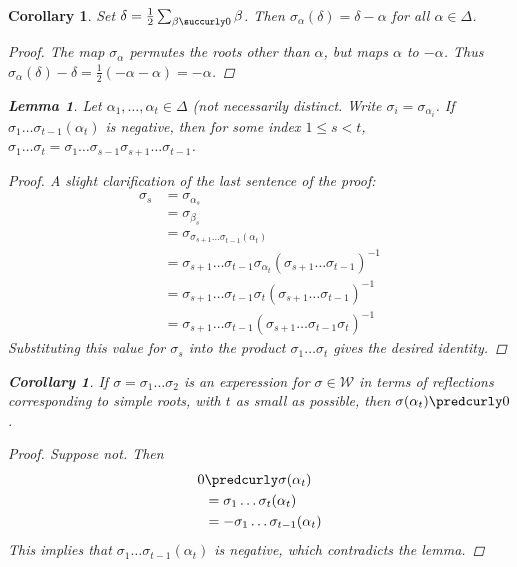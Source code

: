 \documentclass{article}
\newtheorem{lem}[thm]{Lemma}
\newtheorem{cor}[thm]{Corollary}
\begin{document}
\begin{cor} Set $\delta = \frac{1}{2} \sum_{\beta \succurly 0} \beta$. Then $\sigma_\alpha(\delta) = \delta - \alpha$ for all $\alpha \in \Delta$.
\begin{proof}
The map $\sigma_\alpha$ permutes the roots other than $\alpha$, but maps $\alpha$ to $-\alpha$.  
Thus $\sigma_\alpha(\delta) - \delta = \frac{1}{2} (-\alpha - \alpha) = -\alpha$.
\end{proof}

\begin{lem} Let $\alpha_1, \ldots, \alpha_t \in \Delta$ (not necessarily distinct. Write $\sigma_i = \sigma_{\alpha_i}$.
If $\sigma_1 \ldots \sigma_{t-1}(\alpha_t)$ is negative, then for some index 
$1 \le s < t$, $\sigma_1 \ldots \sigma_t = \sigma_1 \ldots \sigma_{s-1} \sigma_{s+1} \ldots
\sigma_{t-1}$.
\begin{proof}
A slight clarification of the last sentence of the proof:
\begin{align*}
\sigma_s & = \sigma_{\alpha_s}
\\ & = \sigma_{\beta_s}
\\ & = \sigma_{\sigma_{s+1} \ldots \sigma_{t-1}(\alpha_t)}
\\ & = \sigma_{s+1} \ldots \sigma_{t-1} \sigma_{\alpha_t}   (\sigma_{s+1} \ldots \sigma_{t-1})^{-1}
\\ & = \sigma_{s+1} \ldots \sigma_{t-1} \sigma_t   (\sigma_{s+1} \ldots \sigma_{t-1})^{-1}
\\ & = \sigma_{s+1} \ldots \sigma_{t-1}  (\sigma_{s+1} \ldots \sigma_{t-1} \sigma_t)^{-1}
\end{align*}
Substituting this value for $\sigma_s$ into the product $\sigma_1 \ldots \sigma_t$ gives
the desired identity.
\end{proof}

\begin{cor} If $\sigma = \sigma_1 \ldots \sigma_2$ is an experession for $\sigma \in \mathcal W$ in terms of reflections corresponding to simple roots, with $t$ as small as possible, then $\sigma(\alpha_t) \predcurly 0$.
\end{cor}
\begin{proof}
Suppose not.  Then 
\begin{align*}
0 & \predcurly \sigma(\alpha_t) 
\\ &  = \sigma_1 \ldots \sigma_t (\alpha_t)
\\ &  = - \sigma_1 \ldots \sigma_{t-1} (\alpha_t)
\end{align*}
This implies that $\sigma_1 \ldots \sigma_{t-1} (\alpha_t)$ is negative, which contradicts the lemma.
\end{proof}


\end{lem}
\end{cor}
\end{document}
